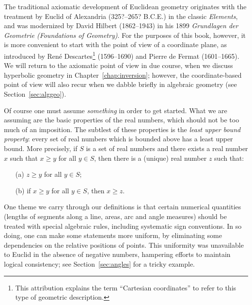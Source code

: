 \documentclass[12pt]{book}
\numberwithin{exc}{section}
\numberwithin{figure}{section}
\numberwithin{equation}{theorem}
\begin{document}
The traditional axiomatic development of Euclidean geometry originates
with the treatment by Euclid of Alexandria
(325?--265? B.C.E.)  in the classic
\textit{Elements}, 
and was modernized
by David Hilbert (1862--1943) 
in his 1899 \textit{Grundlagen der Geometrie (Foundations
of Geometry)}. For the purposes of this book, however, it is more
convenient to start with the point of view of a coordinate plane, as
introduced by Ren\'e Descartes\footnote{This attribution explains the term ``Cartesian coordinates''  to refer to this type of geometric description.} (1596--1690) 
and Pierre de Fermat (1601--1665).  
We will return to the axiomatic
point of view in due course, when we discuss hyperbolic geometry in 
Chapter~\ref{chap:inversion}; however, the coordinate-based point of view will
also recur when we dabble briefly in algebraic geometry (see Section~\ref{sec:alggeo}).

Of course one must assume \emph{something} in order to get started.
What we are assuming are the basic properties of the real numbers, which
should not be too much of an imposition. 
The subtlest of these properties is the
\emph{least upper bound property}:  every set of real numbers which is
bounded above has a least upper bound. More precisely, if $S$ is a set
of real numbers and there exists a real number $x$ such that
$x \geq y$ for all $y \in S$, then there is a (unique) real number $z$
such that:
\begin{enumerate}
\item[(a)] $z \geq y$ for all $y \in S$;
\item[(b)] if $x \geq y$ for all $y \in S$, then $x \geq z$.
\end{enumerate}

One theme we carry through our definitions is that certain numerical
quantities (lengths of segments along a line, areas, arc and angle
measures) should be treated with special algebraic rules, including
systematic sign conventions. In so doing, one can make some statements
more uniform, by eliminating some dependencies on the relative positions
of points. This uniformity was unavailable to Euclid in the absence
of negative numbers, hampering efforts to maintain logical consistency;
see Section~\ref{sec:angles} for a tricky example.
\end{document}
